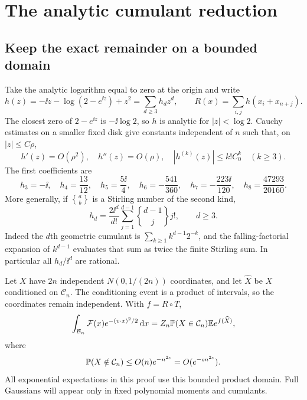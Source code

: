 \section{The analytic cumulant reduction}\label{sqt:sec:analytic}
\subsection{Keep the exact remainder on a bounded domain}
Take the analytic logarithm equal to zero at the origin and write
\begin{equation}\label{sqt:eq:h}
h(z)=-\ii z-\log(2-e^{\ii z})+z^2=\sum_{d\geq3}h_dz^d,
\qquad R(x)=\sum_{i,j}h(x_i+x_{n+j}).
\end{equation}
The closest zero of $2-e^{\ii z}$ is $-\ii\log2$, so $h$ is analytic for $|z|<\log2$. Cauchy estimates on a smaller fixed disk give constants independent of $n$ such that, on $|z|\leq C\rho$,
\begin{equation}\label{sqt:eq:derivativebounds}
h'(z)=O(\rho^2),\quad h''(z)=O(\rho),\quad
|h^{(k)}(z)|\leq k!C_0^k\quad(k\geq3).
\end{equation}
The first coefficients are
\begin{equation}\label{sqt:eq:hsix}
h_3=-\ii,\quad h_4=\frac{13}{12},\quad h_5=\frac{5\ii}{4},\quad
h_6=-\frac{541}{360},\quad h_7=-\frac{223\ii}{120},\quad
h_8=\frac{47293}{20160}.
\end{equation}
More generally, if $\genfrac{\{}{\}}{0pt}{}{a}{b}$ is a Stirling number of the second kind,
\begin{equation}\label{sqt:eq:stirling}
h_d=\frac{2\ii^d}{d!}\sum_{j=1}^{d-1}\genfrac{\{}{\}}{0pt}{}{d-1}{j}j!,\qquad d\geq3.
\end{equation}
Indeed the $d$th geometric cumulant is $\sum_{k\geq1}k^{d-1}2^{-k}$, and the falling-factorial expansion of $k^{d-1}$ evaluates that sum as twice the finite Stirling sum. In particular all $h_d/\ii^d$ are rational.

Let $X$ have $2n$ independent $N(0,1/(2n))$ coordinates, and let $\widehat X$ be $X$ conditioned on $\mathcal C_n$. The conditioning event is a product of intervals, so the coordinates remain independent. With $f=R\circ T$,
\begin{equation}\label{sqt:eq:boundedexpectation}
\int_{\mathcal B_n}\mathcal F(x)e^{-(v\cdot x)^2/2}\,\mathrm d x
 =Z_n\mathbb P(X\in\mathcal C_n)\mathbb E e^{f(\widehat X)},
\end{equation}
where
\begin{equation}\label{sqt:eq:tailprob}
\mathbb P(X\notin\mathcal C_n)\leq O(n)e^{-n^{2\varepsilon}}
 =O(e^{-c n^{2\varepsilon}}).
\end{equation}
All exponential expectations in this proof use this bounded product domain. Full Gaussians will appear only in fixed polynomial moments and cumulants.

